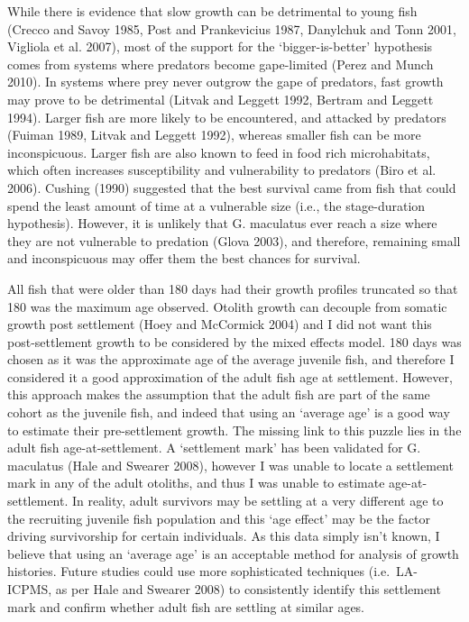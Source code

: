\documentclass[]{book}
\begin{document}
While there is evidence that slow growth can be detrimental to young
fish (Crecco and Savoy 1985, Post and Prankevicius 1987, Danylchuk and
Tonn 2001, Vigliola et al. 2007), most of the support for the
`bigger-is-better' hypothesis comes from systems where predators become
gape-limited (Perez and Munch 2010). In systems where prey never outgrow
the gape of predators, fast growth may prove to be detrimental (Litvak
and Leggett 1992, Bertram and Leggett 1994). Larger fish are more likely
to be encountered, and attacked by predators (Fuiman 1989, Litvak and
Leggett 1992), whereas smaller fish can be more inconspicuous. Larger
fish are also known to feed in food rich microhabitats, which often
increases susceptibility and vulnerability to predators (Biro et al.
2006). Cushing (1990) suggested that the best survival came from fish
that could spend the least amount of time at a vulnerable size (i.e.,
the stage-duration hypothesis). However, it is unlikely that G.
maculatus ever reach a size where they are not vulnerable to predation
(Glova 2003), and therefore, remaining small and inconspicuous may offer
them the best chances for survival.

All fish that were older than 180 days had their growth profiles
truncated so that 180 was the maximum age observed. Otolith growth can
decouple from somatic growth post settlement (Hoey and McCormick 2004)
and I did not want this post-settlement growth to be considered by the
mixed effects model. 180 days was chosen as it was the approximate age
of the average juvenile fish, and therefore I considered it a good
approximation of the adult fish age at settlement. However, this
approach makes the assumption that the adult fish are part of the same
cohort as the juvenile fish, and indeed that using an `average age' is a
good way to estimate their pre-settlement growth. The missing link to
this puzzle lies in the adult fish age-at-settlement. A `settlement
mark' has been validated for G. maculatus (Hale and Swearer 2008),
however I was unable to locate a settlement mark in any of the adult
otoliths, and thus I was unable to estimate age-at-settlement. In
reality, adult survivors may be settling at a very different age to the
recruiting juvenile fish population and this `age effect' may be the
factor driving survivorship for certain individuals. As this data simply
isn't known, I believe that using an `average age' is an acceptable
method for analysis of growth histories. Future studies could use more
sophisticated techniques (i.e.~LA-ICPMS, as per Hale and Swearer 2008)
to consistently identify this settlement mark and confirm whether adult
fish are settling at similar ages.
\end{document}
